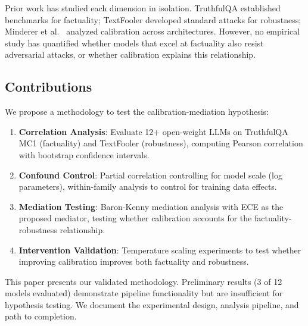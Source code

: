 Prior work has studied each dimension in isolation. TruthfulQA \cite{lin2022truthfulqa} established benchmarks for factuality; TextFooler \cite{jin2019bert} developed standard attacks for robustness; Minderer et al.\ \cite{minderer2021revisiting} analyzed calibration across architectures. However, no empirical study has quantified whether models that excel at factuality also resist adversarial attacks, or whether calibration explains this relationship.

\subsection{Contributions}

We propose a methodology to test the calibration-mediation hypothesis:

\begin{enumerate}
    \item \textbf{Correlation Analysis}: Evaluate 12+ open-weight LLMs on TruthfulQA MC1 (factuality) and TextFooler (robustness), computing Pearson correlation with bootstrap confidence intervals.
    \item \textbf{Confound Control}: Partial correlation controlling for model scale (log parameters), within-family analysis to control for training data effects.
    \item \textbf{Mediation Testing}: Baron-Kenny mediation analysis with ECE as the proposed mediator, testing whether calibration accounts for the factuality-robustness relationship.
    \item \textbf{Intervention Validation}: Temperature scaling experiments to test whether improving calibration improves both factuality and robustness.
\end{enumerate}

This paper presents our validated methodology. Preliminary results (3 of 12 models evaluated) demonstrate pipeline functionality but are insufficient for hypothesis testing. We document the experimental design, analysis pipeline, and path to completion.
